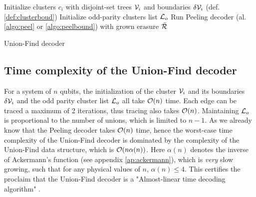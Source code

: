 \begin{algorithm}[h]
  \BlankLine
  \BlankLine
  Initialize clusters $c_i$ with disjoint-set trees $\mathcal{V}_i$ and boundaries $\delta \mathcal{V}_i$ (def. \ref{def:clusterboud})\;
  Initialize odd-parity clusters list $\mathcal{L}_o$\;
  \BlankLine
  Run Peeling decoder (al. \ref{algo:peel} or \ref{algo:peelbound}) with grown erasure $\bar{\mathcal{R}}$
  \BlankLine
  \caption{Union-Find decoder \cite{delfosse2017almost}}\label{algo:uf}
\end{algorithm}

\subsection{Time complexity of the Union-Find decoder}

For a system of $n$ qubits, the initialization of the cluster $\mathcal{V}_i$ and its boundaries $\delta \mathcal{V}_i$ and the odd parity cluster list $\mathcal{L}_o$ all take $\mathcal{O}(n)$ time. Each edge can be traced a maximum of 2 iterations, thus tracing also takes $\mathcal{O}(n)$. Maintaining $\mathcal{L}_o$ is proportional to the number of unions, which is limited to $n-1$. As we already know that the Peeling decoder takes $\mathcal{O}(n)$ time, hence the worst-case time complexity of the Union-Find decoder is dominated by the complexity of the Union-Find data structure, which is $\mathcal{O}(n\alpha(n))$. Here $\alpha(n)$ denotes the inverse of Ackermann's function (see appendix \ref{ap:ackermann}), which is \emph{very} slow growing, such that for any physical values of $n$, $\alpha(n) \leq 4$. This certifies the proclaim that the Union-Find decoder is a "Almost-linear time decoding algorithm" \cite{delfosse2017almost}. 

